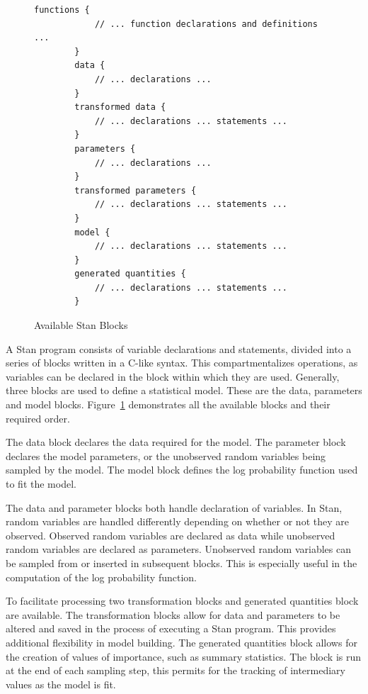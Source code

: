 \begin{figure}[htbp]
    \centering
    \begin{lstlisting}[belowskip=-2 \baselineskip]
        functions {
        	// ... function declarations and definitions ...
        }
        data {
        	// ... declarations ...
        }
        transformed data {
        	// ... declarations ... statements ...
        }
        parameters {
        	// ... declarations ...
        }
        transformed parameters {
        	// ... declarations ... statements ...
        }
        model {
        	// ... declarations ... statements ...
        }
        generated quantities {
        	// ... declarations ... statements ...
        }
    \end{lstlisting}
    \caption{Available Stan Blocks}
    \label{stanblocks}
\end{figure}


A Stan program consists of variable declarations and statements, divided into a series of blocks written in a C-like syntax. This compartmentalizes operations, as variables can be declared in the block within which they are used. Generally, three blocks are used to define a statistical model. These are the data, parameters and model blocks. Figure~\ref{stanblocks} demonstrates all the available blocks and their required order.

The data block declares the data required for the model. The parameter block declares the model parameters, or the unobserved random variables being sampled by the model. The model block defines the log probability function used to fit the model. 

The data and parameter blocks both handle declaration of variables. In Stan, random variables are handled differently depending on whether or not they are observed. Observed random variables are declared as data while unobserved random variables are declared as parameters. Unobserved random variables can be sampled from or inserted in subsequent blocks. This is especially useful in the computation of the log probability function. 

To facilitate processing two transformation blocks and generated quantities block are available. The transformation blocks allow for data and parameters to be altered and saved in the process of executing a Stan program. This provides additional flexibility in model building. The generated quantities block allows for the creation of values of importance, such as summary statistics. The block is run at the end of each sampling step, this permits for the tracking of intermediary values as the model is fit. 

